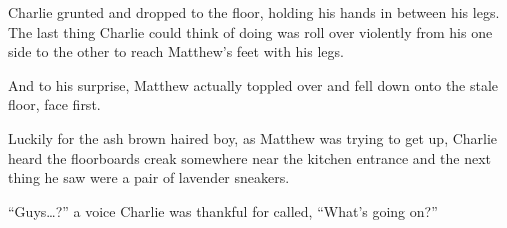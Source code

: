 Charlie grunted and dropped to the floor, holding his hands in between his legs. The last thing Charlie could think of doing was roll over violently from his one side to the other to reach Matthew's feet with his legs.

And to his surprise, Matthew actually toppled over and fell down onto the stale floor, face first.

Luckily for the ash brown haired boy, as Matthew was trying to get up, Charlie heard the floorboards creak somewhere near the kitchen entrance and the next thing he saw were a pair of lavender sneakers.

“Guys…?” a voice Charlie was thankful for called, “What's going on?”